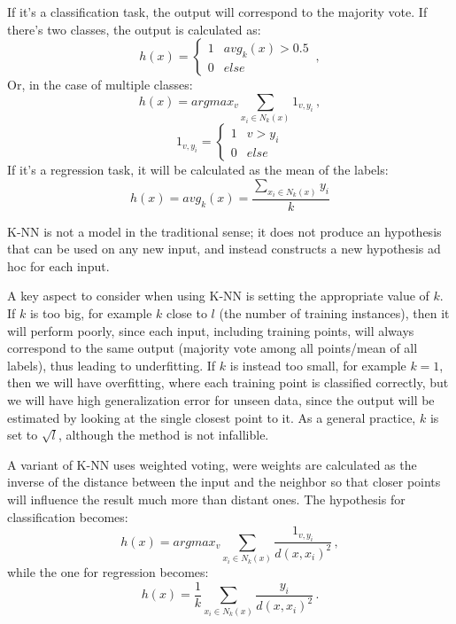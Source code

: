 If it's a classification task, the output will correspond to the majority vote. If there's two classes, the output is calculated as:
\begin{equation*}
    h(x) = \begin{cases}
        1 & avg_k(x) > 0.5 \\
        0 & else
    \end{cases} \, ,
\end{equation*}
Or, in the case of multiple classes:
\begin{equation*}
    h(x) = argmax_v \sum_{x_i \in N_k(x)} 1_{v,y_i}  \, ,
\end{equation*}
\begin{equation*}
    1_{v,y_i} = \begin{cases}
        1 & v > y_i \\
        0 & else
    \end{cases}
\end{equation*}
If it's a regression task, it will be calculated as the mean of the labels:
\begin{equation*}
    h(x) = avg_k(x) = \frac{\sum_{x_i \in N_k(x)} y_i}{k}
\end{equation*}

K-NN is not a model in the traditional sense; it does not produce an hypothesis that can be used on any new input, and instead constructs a new hypothesis ad hoc for each input.

A key aspect to consider when using K-NN is setting the appropriate value of $k$. If $k$ is too big, for example $k$ close to $l$ (the number of training instances), then it will perform poorly, since each input, including training points, will always correspond to the same output (majority vote among all points/mean of all labels), thus leading to underfitting. If $k$ is instead too small, for example $k = 1$, then we will have overfitting, where each training point is classified correctly, but we will have high generalization error for unseen data, since the output will be estimated by looking at the single closest point to it. As a general practice, $k$ is set to $\sqrt{l}$, although the method is not infallible.

A variant of K-NN uses weighted voting, were weights are calculated as the inverse of the distance between the input and the neighbor so that closer points will influence the result much more than distant ones. The hypothesis for classification becomes:
\begin{equation*}
    h(x) = argmax_v \sum_{x_i \in N_k(x)}  \dfrac{1_{v,y_i}}{d(x,x_i)^2} \, ,
\end{equation*}
while the one for regression becomes:
\begin{equation*}
    h(x) = \frac{1}{k}\sum_{x_i \in N_k(x)} \dfrac{y_i}{d(x,x_i)^2} \, .
\end{equation*}

